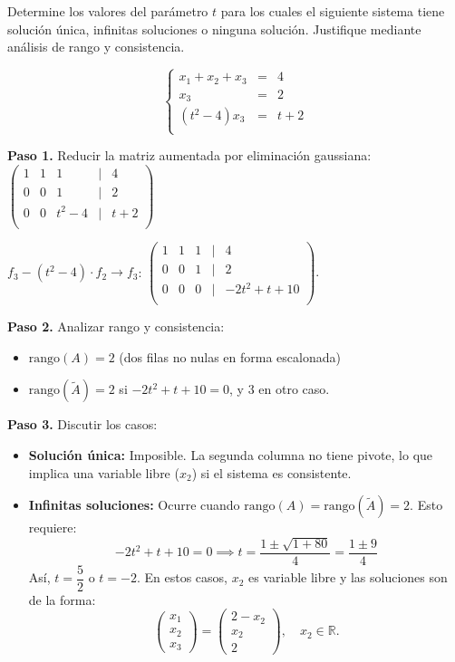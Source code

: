 \begin{example}
Determine los valores del parámetro \( t \) para los cuales el siguiente sistema tiene solución única, infinitas soluciones o ninguna solución. Justifique mediante análisis de rango y consistencia.

\[
\left\lbrace  
\begin{array}{rcl}
x_1 + x_2 + x_3 &=& 4 \\
x_3 &=& 2 \\
\left(t^2 - 4\right)x_3 &=& t + 2 \\
\end{array} 
\right. 
\]

\begin{myproof}
\textbf{Paso 1.} Reducir la matriz aumentada por eliminación gaussiana: \(
\begin{pmatrix}
1 & 1 & 1 & | & 4 \\
0 & 0 & 1 & | & 2 \\
0 & 0 & t^2-4 & | & t+2 \\
\end{pmatrix}
\)

\( f_3 - (t^2-4) \cdot f_2 \to f_3 \): \(
\begin{pmatrix}
1 & 1 & 1 & | & 4 \\
0 & 0 & 1 & | & 2 \\
0 & 0 & 0 & | & -2t^2 + t + 10 \\
\end{pmatrix}.
\)

\textbf{Paso 2.} Analizar rango y consistencia:
\begin{itemize}
\item \(\text{rango}(A) = 2\) (dos filas no nulas en forma escalonada)
\item \(\text{rango}(\tilde{A}) = 2\) si \(-2t^2 + t + 10 = 0\), y \(3\) en otro caso.
\end{itemize}

\textbf{Paso 3.} Discutir los casos:
\begin{itemize}
\item \textbf{Solución única:} Imposible. La segunda columna no tiene pivote, lo que implica una variable libre (\(x_2\)) si el sistema es consistente.

\item \textbf{Infinitas soluciones:} Ocurre cuando \(\text{rango}(A) = \text{rango}(\tilde{A}) = 2\). Esto requiere:
  \[
  -2t^2 + t + 10 = 0 \implies t = \frac{1 \pm \sqrt{1 + 80}}{4} = \frac{1 \pm 9}{4}
  \]
  Así, \( t = \dfrac{5}{2} \) o \( t = -2 \). En estos casos, \(x_2\) es variable libre y las soluciones son de la forma:
  \[
  \begin{pmatrix} x_1 \\ x_2 \\ x_3 \end{pmatrix} = \begin{pmatrix} 2 - x_2 \\ x_2 \\ 2 \end{pmatrix}, \quad x_2 \in \mathbb{R}.
  \]


\end{itemize}
\end{myproof}
\end{example}
